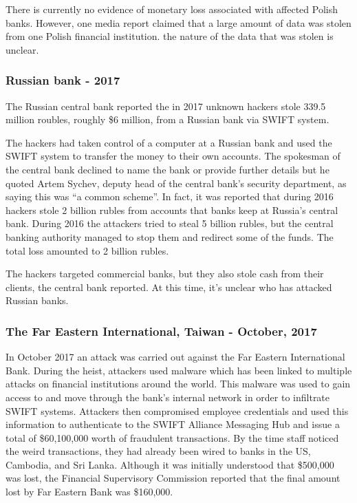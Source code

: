 \documentclass[12pt]{article}
\begin{document}
        There is currently no evidence of monetary loss associated with affected Polish banks. However, one media report claimed that a large amount of data was stolen from one Polish financial institution. the nature of the data that was stolen is unclear.\cite{WlamaniaKilkuBankow}\cite{badcyberSeveralPolishBanks2017}\cite{PolishBanksInfected}
    
    \subsubsection{Russian bank - 2017}
        
        The Russian central bank reported the in 2017 unknown hackers stole 339.5 million roubles, roughly \$6 million, from a Russian bank via SWIFT system. 
        
        The hackers had taken control of a computer at a Russian bank and used the SWIFT system to transfer the money to their own accounts. 
        The spokesman of the central bank declined to name the bank or provide further details but he quoted Artem Sychev, deputy head of the central bank’s security department, as saying this was “a common scheme”. In fact, it was reported that during 2016 hackers stole 2 billion rubles from accounts that banks keep at Russia's central bank. During 2016 the attackers tried to steal 5 billion rubles, but the central banking authority managed to stop them and redirect some of the funds. The total loss amounted to 2 billion rubles.
        
        The hackers targeted commercial banks, but they also stole cash from their clients, the central bank reported. At this time, it's unclear who has attacked Russian banks.\cite{HackersStoleMillion2018}\cite{UnknownHackersStole2018}
        
    \subsubsection{The Far Eastern International, Taiwan - October, 2017}
        In October 2017 an attack was carried out against the Far Eastern International Bank. During the heist, attackers used malware which has been linked to multiple attacks on financial institutions around the world. This malware was used to gain access to and move through the bank’s internal network in order to infiltrate SWIFT systems. Attackers then compromised employee credentials and used this information to authenticate to the SWIFT Alliance Messaging Hub and issue a total of \$60,100,000 worth of fraudulent transactions. By the time staff noticed the weird transactions, they had already been wired to banks in the US, Cambodia, and Sri Lanka. Although it was initially understood that \$500,000 was lost, the Financial Supervisory Commission reported that the final amount lost by Far Eastern Bank was \$160,000.\cite{thomsonHackersNick60m2017}
        
\end{document}
